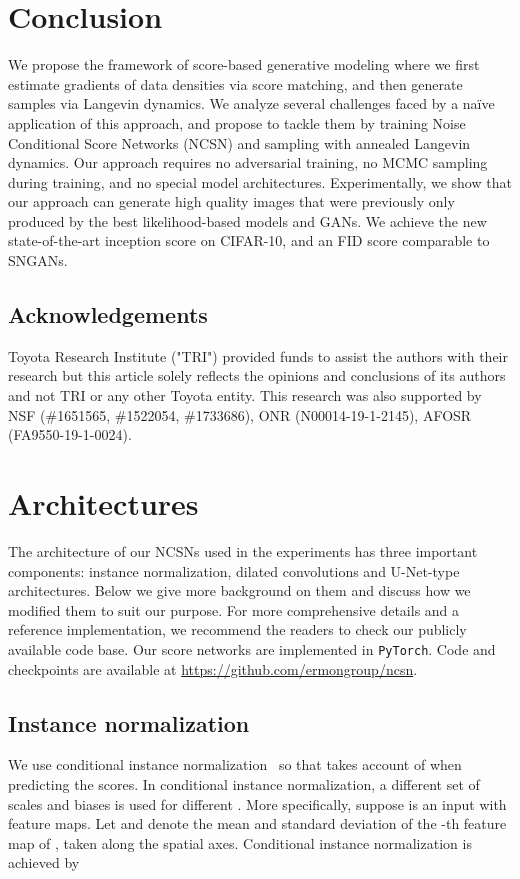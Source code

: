 \documentclass{article}
\begin{document}
 \section{Conclusion}
We propose the framework of score-based generative modeling where we first estimate gradients of data densities via score matching, and then generate samples via Langevin dynamics. We analyze several challenges faced by a na\"{i}ve application of this approach, and propose to tackle them by training Noise Conditional Score Networks (NCSN) and sampling with annealed Langevin dynamics. Our approach requires no adversarial training, no MCMC sampling during training, and no special model architectures. Experimentally, we show that our approach can generate high quality images that were previously only produced by the best likelihood-based models and GANs. We achieve the new state-of-the-art inception score on CIFAR-10, and an FID score comparable to SNGANs. 

\subsection*{Acknowledgements}
Toyota Research Institute ("TRI")  provided funds to assist the authors with their research but this article solely reflects the opinions and conclusions of its authors and not TRI or any other Toyota entity. This research was also supported by NSF (\#1651565, \#1522054, \#1733686), ONR  (N00014-19-1-2145), AFOSR (FA9550-19-1-0024). 
\newpage
\appendix
\section{Architectures}\label{app:arch}
The architecture of our NCSNs used in the experiments has three important components: instance normalization, dilated convolutions and U-Net-type architectures. Below we give more background on them and discuss how we modified them to suit our purpose. For more comprehensive details and a reference implementation, we recommend the readers to check our publicly available code base. Our score networks are implemented in \texttt{PyTorch}. Code and checkpoints are available at \href{https://github.com/ermongroup/ncsn}{\color{cyan} https://github.com/ermongroup/ncsn}.
\subsection{Instance normalization} 
We use conditional instance normalization~\cite{dumoulin2017learned-iclr} so that  takes account of  when predicting the scores. In conditional instance normalization, a different set of scales and biases is used for different . More specifically, suppose  is an input with  feature maps. Let  and  denote the mean and standard deviation of the -th feature map of , taken along the spatial axes. Conditional instance normalization is achieved by
\end{document}
